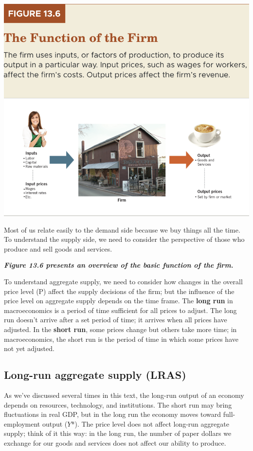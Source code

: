 \documentclass[11pt]{article} %
\begin{document}
\begin{center}
\includegraphics[scale=0.5]{images/Figure 13.6.png} 
\end{center}

Most of us relate easily to the demand side because we buy things all the time. To understand the supply side, we need to consider the perspective of those who produce and sell goods and services.

\textbf{\textit{Figure 13.6 presents an overview of the basic function of the firm.}}

To understand aggregate supply, we need to consider how changes in the overall price level (P) affect the supply decisions of the firm; but the influence of the price level on aggregate supply depends on the time frame. The \textbf{long run} in macroeconomics is a period of time sufficient for all prices to adjust. The long run doesn't arrive after a set period of time; it arrives when all prices have adjusted. In the \textbf{short run}, some prices change but others take more time; in macroeconomics, the short run is the period of time in which some prices have not yet adjusted.

\subsection*{Long-run aggregate supply (LRAS)}
As we've discussed several times in this text, the long-run output of an economy depends on resources, technology, and institutions. The short run may bring fluctuations in real GDP, but in the long run the economy moves toward full-employment output (\(Y\)*). The price level does not affect long-run aggregate supply; think of it this way: in the long run, the number of paper dollars we exchange for our goods and services does not affect our ability to produce.
\end{document}
